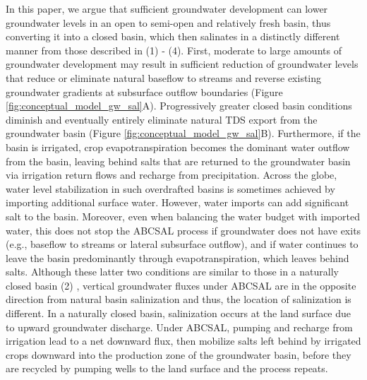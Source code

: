 In this paper, we argue that sufficient groundwater development can lower groundwater levels in an open to semi-open and relatively fresh basin, thus converting it into a closed basin, which then salinates in a distinctly different manner from those described in (1) - (4). First, moderate to large amounts of groundwater development may result in sufficient reduction of groundwater levels that reduce or eliminate natural baseflow to streams \citep{Russo2017, Barlow2015, Hunt1999} and reverse existing groundwater gradients at subsurface outflow boundaries (Figure \ref{fig:conceptual_model_gw_sal}A). Progressively greater closed basin conditions diminish and eventually entirely eliminate natural TDS export from the groundwater basin (Figure \ref{fig:conceptual_model_gw_sal}B). Furthermore, if the basin is irrigated, crop evapotranspiration becomes the dominant water outflow from the basin, leaving behind salts that are returned to the groundwater basin via irrigation return flows and recharge from precipitation. Across the globe, water level stabilization in such overdrafted basins is sometimes achieved by importing additional surface water. However, water imports can add significant salt to the basin. Moreover, even when balancing the water budget with imported water, this does not stop the ABCSAL process if groundwater does not have exits (e.g., baseflow to streams or lateral subsurface outflow), and if water continues to leave the basin predominantly through evapotranspiration, which leaves behind salts. Although these latter two conditions are similar to those in a naturally closed basin (2) \citep{Hardie1970, Jones1978}, vertical groundwater fluxes under ABCSAL are in the opposite direction from natural basin salinization and thus, the location of salinization is different. In a naturally closed basin, salinization occurs at the land surface due to upward groundwater discharge. Under ABCSAL, pumping and recharge from irrigation lead to a net downward flux, then mobilize salts left behind by irrigated crops downward into the production zone of the groundwater basin, before they are recycled by pumping wells to the land surface and the process repeats.

